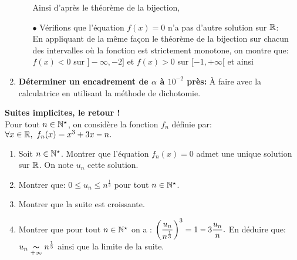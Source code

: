 \documentclass[a4paper, 11pt,reqno]{article}
\begin{document}
\begin{correction}
\begin{enumerate}
\begin{itemize}
\begin{itemize}
			            \end{itemize}
			            Ainsi d'apr\`{e}s le th\'eor\`{e}me de la bijection, 
			      \item[$\bullet$] V\'erifions que l'\'equation $f(x)=0$ n'a pas d'autre solution sur $\mathbb{R}$:\\
			            \noindent En appliquant de la m\^{e}me fa\c{c}on le th\'eor\`{e}me de la bijection sur chacun des intervalles o\`{u} la fonction est strictement monotone, on montre que: $f(x)<0$ sur $\rbrack -\infty,-2\rbrack$ et $f(x)>0$ sur $\lbrack -1,+\infty\lbrack$ et ainsi 
		      \end{itemize}
		\item \textbf{D\'eterminer un encadrement de $\alpha$ \`{a} $10^{-2}$ pr\`{e}s:} \`{A} faire avec la calculatrice en utilisant la m\'ethode de dichotomie.
	\end{enumerate}
\end{correction}
\begin{exercice}  \; \textbf{Suites implicites, le retour !}\\
	Pour tout $n\in\mathbb{N}^{\star}$, on consid\`{e}re la fonction $f_n$ d\'efinie par: $\forall x\in\R,\ f_n(x)=x^3+3x-n.$
	\begin{enumerate}
		\item Soit $n\in\mathbb{N}^{\star}$. Montrer que l'\'equation $f_n(x)=0$ admet une unique solution sur $\mathbb{R}$. On note $u_n$ cette solution.
		\item Montrer que: $0\leq u_n\leq n^{\frac{1}{3}}$ pour tout $n\in\mathbb{N}^{\star}$.
		\item Montrer que la suite est croissante.
		\item  Montrer que pour tout $n\in\mathbb{N}^{\star}$ on a : $\left( \displaystyle\frac{u_n}{n^{\frac{1}{3}}} \right)^3=1-3\displaystyle\frac{u_n}{n}.$ En d\'eduire que: $u_n\underset{+\infty}{\thicksim} n^{\frac{1}{3}}$ ainsi que la limite de la suite.
	\end{enumerate}
\end{exercice}
\end{document}
